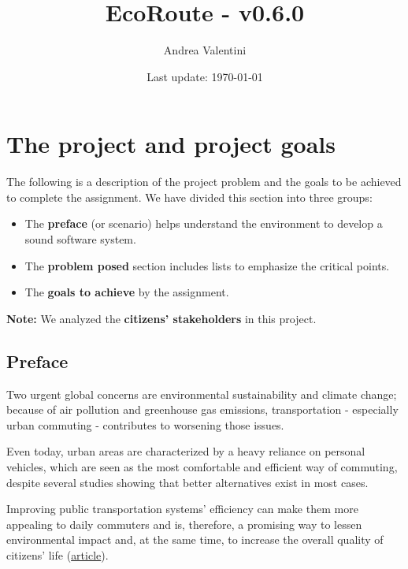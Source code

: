 \documentclass[a4paper]{article}
\newcommand{\highspace}{\vspace{1.2em}\noindent}
\begin{document}
    \author{Andrea Valentini}
    \title{EcoRoute - v0.6.0}
    \date{Last update: \today}
    \maketitle

    \newpage

    \tableofcontents

    \newpage

    \pagestyle{fancy}
    \fancyhead{} %
    \fancyhead[R]{\nouppercase{\leftmark\hfill\rightmark}}

    \section{The project and project goals}

    The following is a description of the project problem and the goals to be achieved to complete the assignment. We have divided this section into three groups:
    \begin{itemize}
        \item The \textbf{preface} (or scenario) helps understand the environment to develop a sound software system.

        \item The \textbf{problem posed} section includes lists to emphasize the critical points.

        \item The \textbf{goals to achieve} by the assignment.
    \end{itemize}
    \textbf{Note:} We analyzed the \textbf{citizens' stakeholders} in this project. 

    \subsection*{Preface}

    Two urgent global concerns are environmental sustainability and climate change; because of air pollution and greenhouse gas emissions, transportation - especially urban commuting - contributes to worsening those issues.

    \highspace
    Even today, urban areas are characterized by a heavy reliance on personal vehicles, which are seen as the most comfortable and efficient way of commuting, despite several studies showing that better alternatives exist in most cases.

    \highspace
    Improving public transportation systems' efficiency can make them more appealing to daily commuters and is, therefore, a promising way to lessen environmental impact and, at the same time, to increase the overall quality of citizens' life (\href{https://journals.plos.org/plosone/article?id=10.1371/journal.pone.0223650}{article}).
\end{document}

